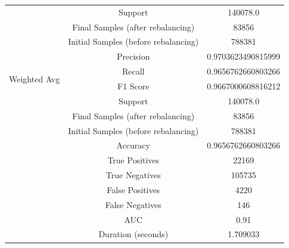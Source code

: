 \begin{longtable}{|c|c|c|}
 & Support & 140078.0 \\
 & Final Samples (after rebalancing) & 83856 \\
 & Initial Samples (before rebalancing) & 788381 \\
\hline
\multirow{4}{*}{Weighted Avg} & Precision & 0.9703623490815999 \\
 & Recall & 0.9656762660803266 \\
 & F1 Score & 0.9667000608816212 \\
 & Support & 140078.0 \\
 & Final Samples (after rebalancing) & 83856 \\
 & Initial Samples (before rebalancing) & 788381 \\
\hline
& Accuracy & 0.9656762660803266 \\ \hline
& True Positives & 22169 \\ \hline
& True Negatives & 105735 \\ \hline
& False Positives & 4220 \\ \hline
& False Negatives & 146 \\ \hline
& AUC & 0.91 \\ \hline
& Duration (seconds) & 1.709033 \\ \hline
\end{longtable}


